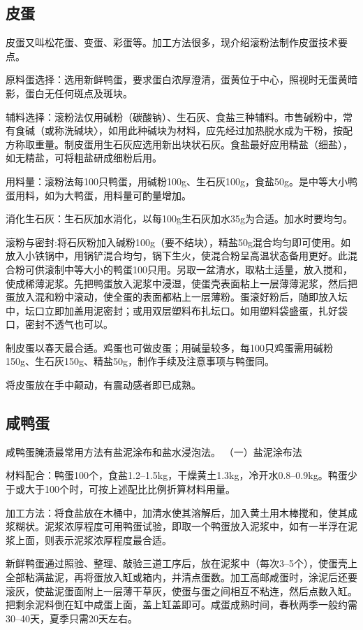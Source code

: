 \documentclass{ctexbook}
\begin{document}
\subsection{皮蛋}
皮蛋又叫松花蛋、变蛋、彩蛋等。加工方法很多，现介绍滚粉法制作皮蛋技术要点。

原料蛋选择：选用新鲜鸭蛋，要求蛋白浓厚澄清，蛋黄位于中心，照视时无蛋黄暗影，蛋白无任何斑点及斑块。

辅料选择：滚粉法仅用碱粉（碳酸钠）、生石灰、食盐三种辅料。市售碱粉中，常有食碱（或称洗碱块〉，如用此种碱块为材料，应先经过加热脱水成为干粉，按配方称取重量。制皮蛋用生石灰应选用新出块状石灰。食盐最好应用精盐（细盐），如无精盐，可将粗盐研成细粉后用。

用料量：滚粉法每100只鸭蛋，用碱粉100g、生石灰100g，食盐50g。是中等大小鸭蛋用料，如为大鸭蛋，用料量可酌量增加。

消化生石灰：生石灰加水消化，以每100g生石灰加水35g为合适。加水时要均匀。

滚粉与密封:将石灰粉加入碱粉100g（要不结块），精盐50g混合均匀即可使用。如放入小铁锅中，用锅铲混合均匀，锅下生火，使混合粉呈高温状态备用更好。此混合粉可供滚制中等大小的鸭蛋100只用。另取一盆清水，取粘土适量，放入搅和，使成稀薄泥浆。先把鸭蛋放入泥浆中浸湿，使蛋壳表面粘上一层薄薄泥浆，然后把蛋放入混和粉中滚动，使全蛋的表面都粘上一层薄粉。蛋滚好粉后，随即放入坛中，坛口立即加盖用泥密封；或用双层塑料布扎坛口。如用塑料袋盛蛋，扎好袋口，密封不透气也可以。

制皮蛋以春天最合适。鸡蛋也可做皮蛋；用碱量较多，每100只鸡蛋需用碱粉150g、生石灰150g、精盐50g，制作手续及注意事项与鸭蛋同。

将皮蛋放在手中颠动，有震动感者即已成熟。
\subsection{咸鸭蛋}
咸鸭蛋腌渍最常用方法有盐泥涂布和盐水浸泡法。
（一）盐泥涂布法

材料配合：鸭蛋100个，食盐1.2--1.5kg，干燥黄土1.3kg，冷开水0.8--0.9kg。鸭蛋少于或大于100个时，可按上述配比比例折算材料用量。

加工方法：将食盐放在木桶中，加清水使其溶解后，加入黄土用木棒搅和，使其成浆糊状。泥浆浓厚程度可用鸭蛋试验，即取一个鸭蛋放入泥浆中，如有一半浮在泥浆上面，则表示泥浆浓厚程度最合适。

新鲜鸭蛋通过照验、整理、敲验三道工序后，放在泥浆中（每次3--5个），使蛋壳上全部粘满盐泥，再将蛋放入缸或箱内，并清点蛋数。加工高邮咸蛋时，涂泥后还要滚灰，使盐泥蛋面附上一层薄干草灰，使蛋与蛋之间相互不粘连，然后点数入缸。把剩余泥料倒在缸中咸蛋上面，盖上缸盖即可。咸蛋成熟时间，春秋两季一般约需30--40天，夏季只需20天左右。
\end{document}

